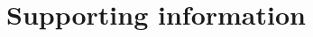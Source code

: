 \documentclass[10pt,letterpaper]{article}
\theoremstyle{plain}
\theoremstyle{remark}
\begin{document}
\section*{Supporting information}




\end{document}
